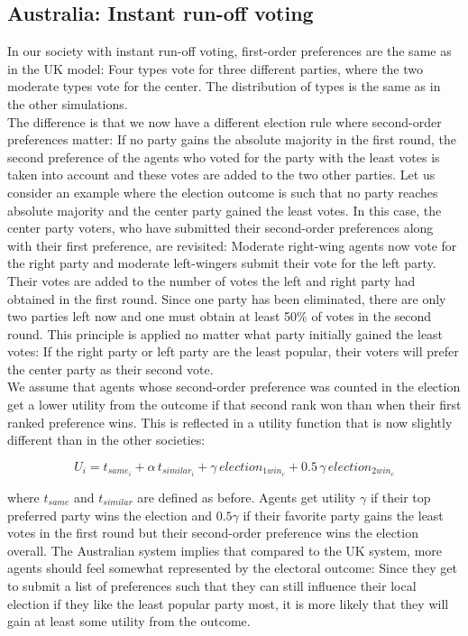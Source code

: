 \documentclass[12pt, a4paper]{article}
\begin{document}
	
	\subsection{Australia: Instant run-off voting} 
	In our society with instant run-off voting, first-order preferences are the same as in the UK model: Four types vote for three different parties, where the two moderate types vote for the center. The distribution of types is the same as in the other simulations. \\
	The difference is that we now have a different election rule where second-order preferences matter: If no party gains the absolute majority in the first round, the second preference of the agents who voted for the party with the least votes is taken into account and these votes are added to the two other parties. Let us consider an example where the election outcome is such that no party reaches absolute majority and the center party gained the least votes. In this case, the center party voters, who have submitted their second-order preferences along with their first preference, are revisited: Moderate right-wing agents now vote for the right party and moderate left-wingers submit their vote for the left party. Their votes are added to the number of votes the left and right party had obtained in the first round. Since one party has been eliminated, there are only two parties left now and one must obtain at least 50\% of votes in the second round. This principle is applied no matter what party initially gained the least votes: If the right party or left party are the least popular, their voters will prefer the center party as their second vote. \\
	We assume that agents whose second-order preference was counted in the election get a lower utility from the outcome if that second rank won than when their first ranked preference wins. This is reflected in a utility function that is now slightly different than in the other societies:
	
	\begin{equation}
	U_i=t_{same_i}+\alpha \, t_{similar_i}+\gamma \, election_{1win_c} + 0.5 \, \gamma \, election_{2win_c}
	\end{equation}
	
	where $t_{same}$ and $t_{similar}$ are defined as before. Agents get utility $\gamma$ if their top preferred party wins the election and $0.5 \gamma$ if their favorite party gains the least votes in the first round but their second-order preference wins the election overall.
	The Australian system implies that compared to the UK system, more agents should feel somewhat represented by the electoral outcome: Since they get to submit a list of preferences such that they can still influence their local election if they like the least popular party most, it is more likely that they will gain at least some utility from the outcome.
	
\end{document}

